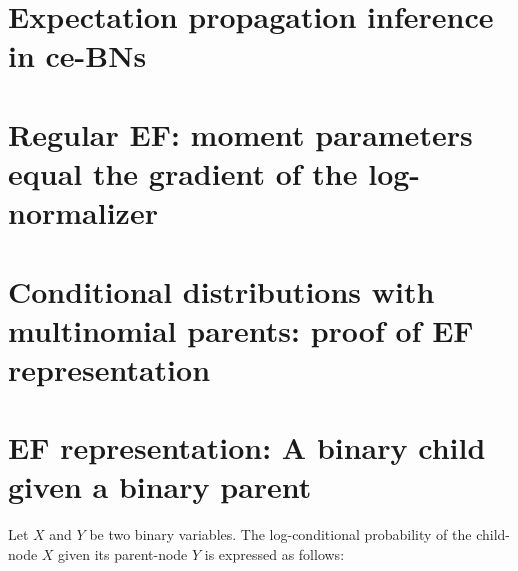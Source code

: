 \documentclass[11pt, oneside]{article}   	%
\numberwithin{figure}{section}
\numberwithin{equation}{section}
\numberwithin{table}{section}
\theoremstyle{definition}
\begin{document}
\section{Expectation propagation inference in ce-BNs}


\begin{appendices}



\section{Regular EF: moment parameters equal the gradient of the log-normalizer}\label{appendix:regularEFequality}


\section{Conditional distributions with multinomial parents: proof of EF representation}\label{appendix:CD_With_MParents:Representation}

\section{EF representation: A binary child given a binary parent}

Let $X$ and $Y$ be two binary variables. The log-conditional probability of the child-node $X$ given its parent-node $Y$ is expressed as follows:


\end{appendices}
\end{document}
